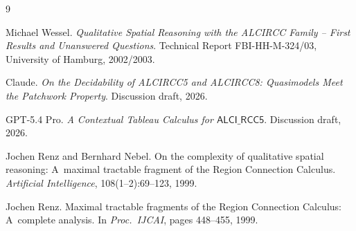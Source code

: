 \documentclass[11pt]{article}
\theoremstyle{definition}
\newcommand{\ALCIRCC}{\mathsf{ALCI\_RCC5}}
\begin{document}
\begin{thebibliography}{9}

Michael Wessel.
\newblock \emph{Qualitative Spatial Reasoning with the ALCIRCC Family
  -- First Results and Unanswered Questions}.
\newblock Technical Report FBI-HH-M-324/03, University of Hamburg,
  2002/2003.

Claude.
\newblock \emph{On the Decidability of ALCIRCC5 and ALCIRCC8:
  Quasimodels Meet the Patchwork Property}.
\newblock Discussion draft, 2026.

GPT-5.4 Pro.
\newblock \emph{A Contextual Tableau Calculus for $\ALCIRCC$}.
\newblock Discussion draft, 2026.

Jochen Renz and Bernhard Nebel.
\newblock On the complexity of qualitative spatial reasoning:
  A~maximal tractable fragment of the Region Connection Calculus.
\newblock \emph{Artificial Intelligence}, 108(1--2):69--123, 1999.

Jochen Renz.
\newblock Maximal tractable fragments of the Region Connection
  Calculus: A~complete analysis.
\newblock In \emph{Proc.\ IJCAI}, pages 448--455, 1999.

\end{thebibliography}
\end{document}
